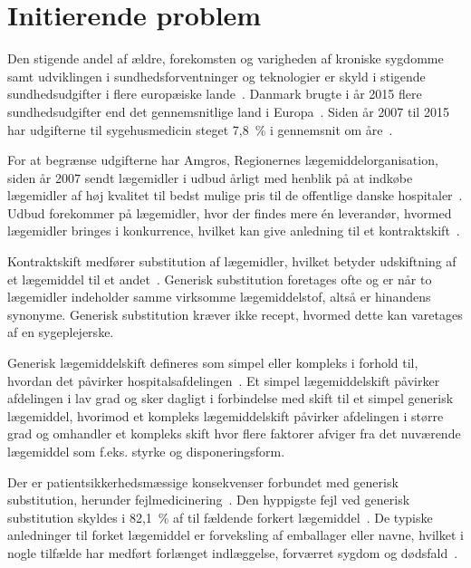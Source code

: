 \chapter{Initierende problem}
Den stigende andel af ældre, forekomsten og varigheden af kroniske sygdomme samt udviklingen i sundhedsforventninger og teknologier er skyld i stigende sundhedsudgifter i flere europæiske lande~\citep{Ess2003}. Danmark brugte i år 2015 flere sundhedsudgifter end det gennemsnitlige land i Europa~\citep{EU2017}.  Siden år 2007 til 2015 har udgifterne til sygehusmedicin steget 7,8~\% i gennemsnit om åre~\citep{Sundhed2016}.

For at begrænse udgifterne har Amgros, Regionernes lægemiddelorganisation, siden år 2007 sendt lægemidler i udbud årligt med henblik på at indkøbe lægemidler af høj kvalitet til bedst mulige pris til de offentlige danske hospitaler~\citep{Sygehusapoteket2017}. Udbud forekommer på lægemidler, hvor der findes mere én leverandør, hvormed lægemidler bringes i konkurrence, hvilket kan give anledning til et kontraktskift~\citep{Amgros2015}.

Kontraktskift medfører substitution af lægemidler, hvilket betyder udskiftning af et lægemiddel til et andet~\citep{DanskSelskabforPatientsikkerhed2009}. %
Generisk substitution foretages ofte og er når to lægemidler indeholder samme virksomme lægemiddelstof, altså er hinandens synonyme. Generisk substitution kræver ikke recept, hvormed dette kan varetages af en sygeplejerske.~\citep{DanskSelskabforPatientsikkerhed2009} %

Generisk lægemiddelskift defineres som simpel eller kompleks i forhold til, hvordan det påvirker hospitalsafdelingen~\citep{Laegemiddelinformaion2017, Sygehusapoteket2017a}. Et simpel lægemiddelskift påvirker afdelingen i lav grad og sker dagligt i forbindelse med skift til et simpel generisk lægemiddel, hvorimod 
et kompleks lægemiddelskift påvirker afdelingen i større grad og omhandler et kompleks skift hvor flere faktorer afviger fra det nuværende lægemiddel som f.eks. styrke og disponeringsform.~\citep{Laegemiddelinformaion2017, Sygehusapoteket2017a}

Der er patientsikkerhedsmæssige konsekvenser forbundet med generisk substitution, herunder fejlmedicinering~\citep{Hakonsen2010}. %
Den hyppigste fejl ved generisk substitution skyldes i 82,1~\% af til fældende forkert lægemiddel~\citep{Hakonsen2010}. De typiske anledninger til forket lægemiddel er forveksling af emballager eller navne, hvilket i nogle tilfælde har medført forlænget indlæggelse, forværret sygdom og dødsfald~\citep{DanskSelskabforPatientsikkerhed2009}.


